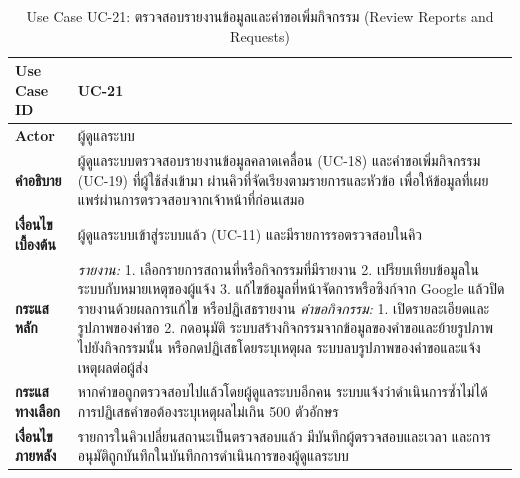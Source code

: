 \begin{table}[H]
\centering
\caption{Use Case UC-21: ตรวจสอบรายงานข้อมูลและคำขอเพิ่มกิจกรรม (Review Reports and Requests)}
\label{tab:uc21}
\begin{tabular}{|p{3.2cm}|p{10cm}|}
\hline
\textbf{Use Case ID} & UC-21 \\ \hline
\textbf{Actor} & ผู้ดูแลระบบ \\ \hline
\textbf{คำอธิบาย} & ผู้ดูแลระบบตรวจสอบรายงานข้อมูลคลาดเคลื่อน (UC-18) และคำขอเพิ่มกิจกรรม (UC-19) ที่ผู้ใช้ส่งเข้ามา ผ่านคิวที่จัดเรียงตามรายการและหัวข้อ เพื่อให้ข้อมูลที่เผยแพร่ผ่านการตรวจสอบจากเจ้าหน้าที่ก่อนเสมอ \\ \hline
\textbf{เงื่อนไขเบื้องต้น} & ผู้ดูแลระบบเข้าสู่ระบบแล้ว (UC-11) และมีรายการรอตรวจสอบในคิว \\ \hline
\textbf{กระแสหลัก} & \textit{รายงาน:} 1. เลือกรายการสถานที่หรือกิจกรรมที่มีรายงาน 2. เปรียบเทียบข้อมูลในระบบกับหมายเหตุของผู้แจ้ง 3. แก้ไขข้อมูลที่หน้าจัดการหรือซิงก์จาก Google แล้วปิดรายงานด้วยผลการแก้ไข หรือปฏิเสธรายงาน \newline \textit{คำขอกิจกรรม:} 1. เปิดรายละเอียดและรูปภาพของคำขอ 2. กดอนุมัติ ระบบสร้างกิจกรรมจากข้อมูลของคำขอและย้ายรูปภาพไปยังกิจกรรมนั้น \newline หรือกดปฏิเสธโดยระบุเหตุผล ระบบลบรูปภาพของคำขอและแจ้งเหตุผลต่อผู้ส่ง \\ \hline
\textbf{กระแสทางเลือก} & หากคำขอถูกตรวจสอบไปแล้วโดยผู้ดูแลระบบอีกคน ระบบแจ้งว่าดำเนินการซ้ำไม่ได้ \newline การปฏิเสธคำขอต้องระบุเหตุผลไม่เกิน 500 ตัวอักษร \\ \hline
\textbf{เงื่อนไขภายหลัง} & รายการในคิวเปลี่ยนสถานะเป็นตรวจสอบแล้ว มีบันทึกผู้ตรวจสอบและเวลา และการอนุมัติถูกบันทึกในบันทึกการดำเนินการของผู้ดูแลระบบ \\
\hline
\end{tabular}
\end{table}

